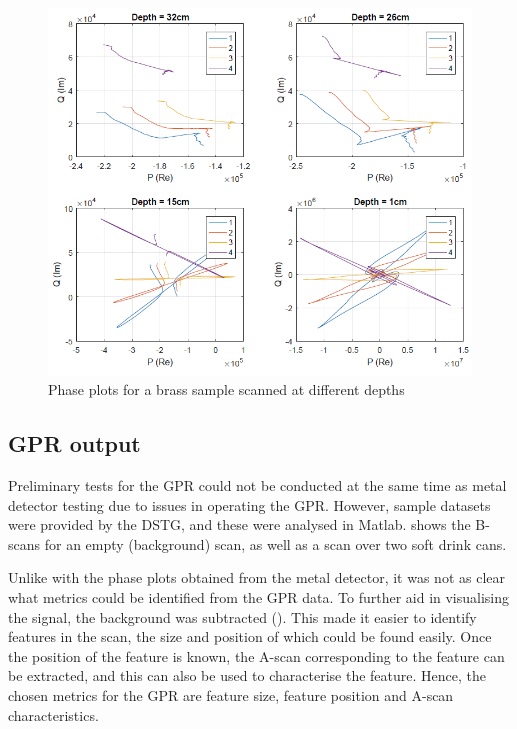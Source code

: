 \documentclass[main.tex]{subfiles}
\begin{document}
\begin{figure}[ht]
\includegraphics[width=\textwidth]{3-ConceptDesign/phaseDepth.PNG}
\centering
\caption{Phase plots for a brass sample scanned at different depths} 
\end{figure}

\subsection{GPR output}
Preliminary tests for the GPR could not be conducted at the same time as metal detector testing due to issues in operating the GPR. However, sample datasets were provided by the DSTG, and these were analysed in Matlab.  shows the B-scans for an empty (background) scan, as well as a scan over two soft drink cans. 

Unlike with the phase plots obtained from the metal detector, it was not as clear what metrics could be identified from the GPR data. To further aid in visualising the signal, the background was subtracted (). This made it easier to identify features in the scan, the size and position of which could be found easily. Once the position of the feature is known, the A-scan corresponding to the feature can be extracted, and this can also be used to characterise the feature. Hence, the chosen metrics for the GPR are feature size, feature position and A-scan characteristics.
\end{document}
